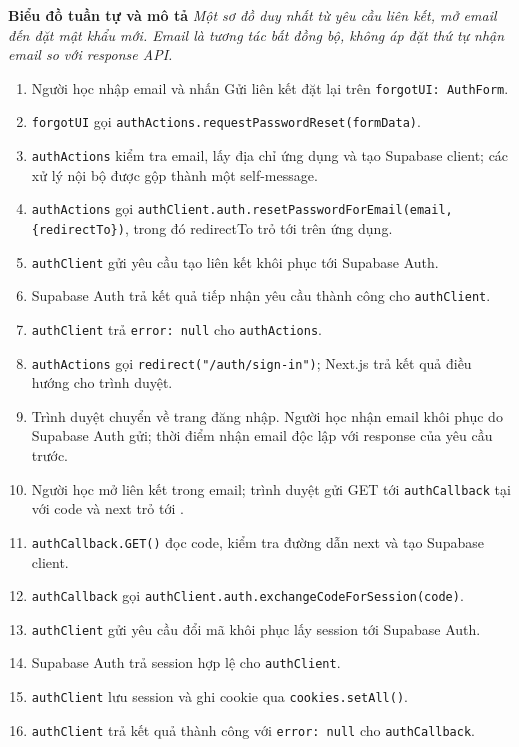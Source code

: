 \documentclass[12pt,a4paper,oneside]{report}
\begin{document}
\noindent\textbf{Biểu đồ tuần tự và mô tả}
\noindent\textit{Một sơ đồ duy nhất từ yêu cầu liên kết, mở email đến đặt mật khẩu mới. Email là tương tác bất đồng bộ, không áp đặt thứ tự nhận email so với response API.}
\begin{enumerate}
    \item Người học nhập email và nhấn Gửi liên kết đặt lại trên \texttt{forgotUI: AuthForm}.
    \item \texttt{forgotUI} gọi \texttt{authActions.requestPasswordReset(formData)}.
    \item \texttt{authActions} kiểm tra email, lấy địa chỉ ứng dụng và tạo Supabase client; các xử lý nội bộ được gộp thành một self-message.
    \item \texttt{authActions} gọi \texttt{authClient.auth.resetPasswordForEmail(email, \{redirectTo\})}, trong đó redirectTo trỏ tới  trên ứng dụng.
    \item \texttt{authClient} gửi yêu cầu tạo liên kết khôi phục tới Supabase Auth.
    \item Supabase Auth trả kết quả tiếp nhận yêu cầu thành công cho \texttt{authClient}.
    \item \texttt{authClient} trả \texttt{error: null} cho \texttt{authActions}.
    \item \texttt{authActions} gọi \texttt{redirect("/auth/sign-in")}; Next.js trả kết quả điều hướng cho trình duyệt.
    \item Trình duyệt chuyển về trang đăng nhập. Người học nhận email khôi phục do Supabase Auth gửi; thời điểm nhận email độc lập với response của yêu cầu trước.
    \item Người học mở liên kết trong email; trình duyệt gửi GET tới \texttt{authCallback} tại  với code và next trỏ tới .
    \item \texttt{authCallback.GET()} đọc code, kiểm tra đường dẫn next và tạo Supabase client.
    \item \texttt{authCallback} gọi \texttt{authClient.auth.exchangeCodeForSession(code)}.
    \item \texttt{authClient} gửi yêu cầu đổi mã khôi phục lấy session tới Supabase Auth.
    \item Supabase Auth trả session hợp lệ cho \texttt{authClient}.
    \item \texttt{authClient} lưu session và ghi cookie qua \texttt{cookies.setAll()}.
    \item \texttt{authClient} trả kết quả thành công với \texttt{error: null} cho \texttt{authCallback}.

\end{enumerate}
\end{document}

